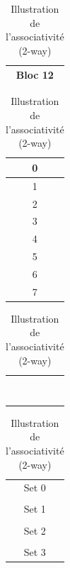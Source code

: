 \documentclass[12pt]{base}
\begin{document}
\begin{table}[H]
    \centering
    \begin{minipage}{.2\linewidth}
        \centering
        \begin{tabular}{|c|}
            \hline Bloc 12 \\ \hline
        \end{tabular}
    \end{minipage}%
    \begin{minipage}{.3\linewidth}
        \centering
        
        \caption*{Cache \\(4 ensembles)}
        \begin{tabular}{|c|}
            \hline
            \text{  }0\text{  }\\ \hline
            1\\ \hline
            2\\ \hline
            3\\ \hline
            4\\ \hline
            5\\ \hline
            6\\ \hline
            7\\ \hline
        \end{tabular}
        \begin{tabular}{|c|}
            \hline
            \rowcolor{LightCyan}\\
            \rowcolor{LightCyan}\\ \hline
            \\
            \\ \hline
            \rowcolor{LightCyan}\\
            \rowcolor{LightCyan}\\ \hline
            \\
            \\ \hline
        \end{tabular}
        \begin{tabular}{c}
            Set 0\\
            \\
            Set 1\\
            \\
            Set 2\\
            \\
            Set 3\\
        \end{tabular}
    \end{minipage}
\caption{Illustration de l'associativité (2-way)\\}

\label{tab:miss}   
\end{table}
\end{document}
